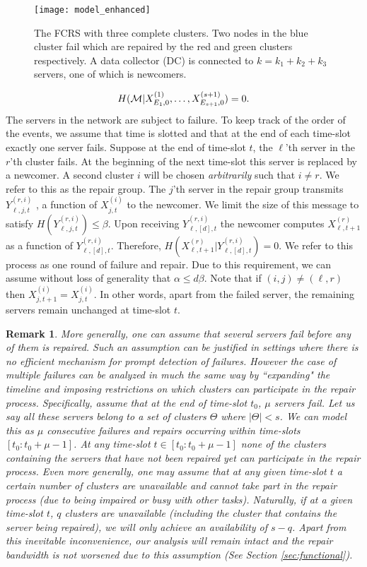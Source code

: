 \documentclass[journal,onecolumn,draftcls]{IEEEtran}
\newtheorem{rem}{Remark}
\begin{document}
\begin{figure}[h]
\centering
\texttt{[image: model\_enhanced]}
\caption{The  FCRS with three complete clusters. Two nodes in the blue cluster fail which are repaired by the red and green clusters respectively. A data collector (DC) is connected to $k = k_1 + k_2 + k_3$ servers, one of which is newcomers.}
\label{fig:somemodel}
\end{figure}
\begin{eqnarray}
H({\cal M}|X^{(1)}_{E_1,0},\dots, X^{(s+1)}_{E_{s+1},0}) = 0.
\label{eqn:datarecoveryspecial}
\end{eqnarray}
The servers in the network are subject to failure. To keep track of the order of the events, we assume that time is slotted and that at the end of each time-slot exactly one server fails. Suppose at the end of time-slot $t$, the $\ell$'th server in the $r$'th cluster fails. At the beginning of the next time-slot this server is replaced by a newcomer. 
 A second cluster $i$ will be chosen {\it arbitrarily} such that $i\neq r$. We refer to this as the repair group. The $j$'th server in the repair group transmits $Y^{(r,i)}_{\ell,j,t}$ , a function of $X^{(i)}_{j,t}$ to the newcomer. We limit the size of this message to satisfy $H(Y^{(r,i)}_{\ell,j,t})\le \beta$. Upon receiving $Y^{(r,i)}_{\ell,[d],t}$ the newcomer computes $X^{(r)}_{\ell,t+1}$ as a function of $Y^{(r,i)}_{\ell,[d],t}$. Therefore,  $H(X^{(r)}_{\ell,t+1}| Y^{(r,i)}_{\ell,[d],t}) = 0$. We refer to this process as one round of failure and repair. Due to this requirement, we can assume without loss of generality that $\alpha \le d\beta$. Note that if $(i,j)\neq (\ell,r)$ then $X^{(i)}_{j,t+1} = X^{(i)}_{j,t}$.  In other words, apart from the failed server, the remaining servers remain unchanged at time-slot $t$. 
\begin{rem} More generally, one can assume that several servers fail before any of them is repaired. Such an assumption can be justified in settings where there is no efficient mechanism for prompt detection of failures. However the case of multiple failures can be analyzed in much the same way by ``expanding" the timeline and imposing restrictions on which clusters can participate in the repair process. Specifically, assume that at the end of time-slot $t_0$, $\mu$ servers fail. Let us say all these servers belong to a set of clusters $\Theta$ where $|\Theta|< s$. We can model this as $\mu$ consecutive failures and repairs occurring within time-slots $[t_0: t_0 + \mu -1]$. At any time-slot $t\in [t_0: t_0 + \mu -1]$ none of the clusters containing the servers that have not been repaired yet can participate in the repair process. Even more generally, one may assume that at any given time-slot $t$ a certain number of clusters are unavailable and cannot take part in the repair process (due to being impaired or busy with other tasks). Naturally, if at a given time-slot $t$, $q$ clusters are unavailable (including the cluster that contains the server being repaired), we will only achieve an availability of $s -  q$. Apart from this inevitable inconvenience, our analysis will remain intact and the  repair bandwidth is not worsened due to this assumption (See Section \ref{sec:functional}).
 \end{rem}
 
\end{document}
